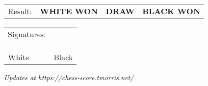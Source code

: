 \documentclass[12pt,landscape,twocolumn,letterpaper]{article}
\begin{document}
\vspace{0.1in}

\begin{tabular}{p{.6in}p{1.5in}p{1.0in}p{1.2in}}
Result:&{\bf WHITE WON}&{\bf DRAW}&{\bf BLACK WON} \\
\end{tabular}

\vspace{0.1in}


\begin{tabular}{p{2in}p{.3in}p{2in}}
\multicolumn{2}{l}{Signatures:} \\
& \\
& \\
& \\ 
\cline{1-1} \cline{3-3}
White&&Black \\
\end{tabular}

\vspace{0.25in}

{\tiny\it
Updates at https://chess-score.tmorris.net/
}

\newpage
\pagestyle{empty}
\end{document}
